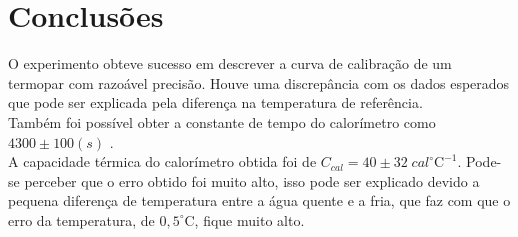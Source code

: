 \documentclass[12pt,a4paper]{article}
\begin{document}
\section{Conclusões}
O experimento obteve sucesso em descrever a curva de calibração de um termopar com razoável precisão. Houve uma discrepância com os dados esperados que pode ser explicada pela diferença na temperatura de referência.\\
Também foi possível obter a constante de tempo do calorímetro como $4300 \pm 100 (s)$ . \\
A capacidade térmica do calorímetro obtida foi de $C_{cal} = 40 \pm 32 \;cal ^{\circ}\mathrm{C}^{-1} $. Pode-se perceber que o erro obtido foi muito alto, isso pode ser explicado devido a pequena diferença de temperatura entre a água quente e a fria, que faz com que o erro da temperatura, de $ 0,5^{\circ}\mathrm{C} $, fique muito alto.
\end{document}
